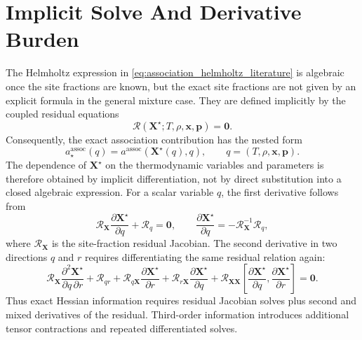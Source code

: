 \documentclass[12pt,letterpaper]{article}
\newcommand{\assoc}{\mathrm{assoc}}
\begin{document}
\section{Implicit Solve And Derivative Burden}

The Helmholtz expression in \eqref{eq:association_helmholtz_literature} is
algebraic once the site fractions are known, but the exact site fractions are
not given by an explicit formula in the general mixture case. They are defined
implicitly by the coupled residual equations
\begin{equation}
    \boldsymbol{\mathcal{R}}
    \left(
        \mathbf{X}^{\star};T,\rho,\mathbf{x},\mathbf{p}
    \right)
    =
    \mathbf{0}.
    \label{eq:implicit_site_fraction_system}
\end{equation}
Consequently, the exact association contribution has the nested form
\begin{equation}
    a^\assoc_{\star}(q)
    =
    a^\assoc
    \left(
        \mathbf{X}^{\star}(q),q
    \right),
    \qquad
    q=(T,\rho,\mathbf{x},\mathbf{p}).
    \label{eq:implicit_assoc_nested_form}
\end{equation}
The dependence of \(\mathbf{X}^{\star}\) on the thermodynamic variables and
parameters is therefore obtained by implicit differentiation, not by direct
substitution into a closed algebraic expression. For a scalar variable \(q\),
the first derivative follows from
\begin{equation}
    \mathcal{R}_{\mathbf{X}}
    \frac{\partial \mathbf{X}^{\star}}{\partial q}
    +
    \mathcal{R}_{q}
    =
    \mathbf{0},
    \qquad
    \frac{\partial \mathbf{X}^{\star}}{\partial q}
    =
    -
    \mathcal{R}_{\mathbf{X}}^{-1}
    \mathcal{R}_{q},
    \label{eq:implicit_first_derivative}
\end{equation}
where \(\mathcal{R}_{\mathbf{X}}\) is the site-fraction residual Jacobian. The
second derivative in two directions \(q\) and \(r\) requires differentiating
the same residual relation again:
\begin{equation}
    \mathcal{R}_{\mathbf{X}}
    \frac{\partial^2 \mathbf{X}^{\star}}{\partial q\,\partial r}
    +
    \mathcal{R}_{qr}
    +
    \mathcal{R}_{q\mathbf{X}}
    \frac{\partial \mathbf{X}^{\star}}{\partial r}
    +
    \mathcal{R}_{r\mathbf{X}}
    \frac{\partial \mathbf{X}^{\star}}{\partial q}
    +
    \mathcal{R}_{\mathbf{X}\mathbf{X}}
    \left[
        \frac{\partial \mathbf{X}^{\star}}{\partial q},
        \frac{\partial \mathbf{X}^{\star}}{\partial r}
    \right]
    =
    \mathbf{0}.
    \label{eq:implicit_second_derivative}
\end{equation}
Thus exact Hessian information requires residual Jacobian solves plus second
and mixed derivatives of the residual. Third-order information introduces
additional tensor contractions and repeated differentiated solves.
\end{document}
